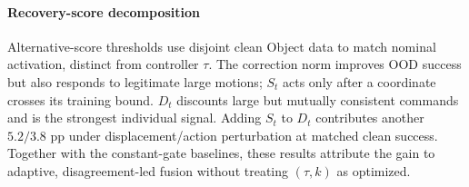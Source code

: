 \documentclass[letterpaper, 10 pt, conference]{ieeeconf}
\begin{document}
\begin{table}[t]
\caption{Component and gate-score ablations (success, \%).}
\label{tab:ablations}
\centering
{}
\end{table}


\paragraph{Recovery-score decomposition}
Alternative-score thresholds use disjoint clean Object data to match nominal activation, distinct from controller $\tau$. The correction norm improves OOD success but also responds to legitimate large motions; $S_t$ acts only after a coordinate crosses its training bound. $D_t$ discounts large but mutually consistent commands and is the strongest individual signal. Adding $S_t$ to $D_t$ contributes another $5.2/3.8$ pp under displacement/action perturbation at matched clean success. Together with the constant-gate baselines, these results attribute the gain to adaptive, disagreement-led fusion without treating $(\tau,k)$ as optimized.
\end{document}
